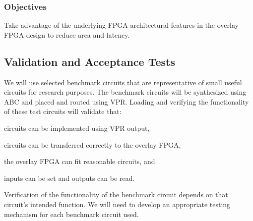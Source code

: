 \subsubsection{Objectives}

\begin{itemlist}
	\item Take advantage of the underlying FPGA architectural features in the overlay FPGA design to reduce area and latency.
\end{itemlist}


\subsection{Validation and Acceptance Tests}


We will use selected benchmark circuits  that are representative of small useful circuits for research purposes.
The benchmark circuits will be synthesized using ABC and placed and routed using VPR.
Loading and verifying the functionality of these test circuits will validate that:
\begin{itemlist}
	\item circuits can be implemented using VPR output,
	\item circuits can be transferred correctly to the overlay FPGA,
	\item the overlay FPGA can fit reasonable circuits, and
	\item inputs can be set and outputs can be read.
\end{itemlist}

Verification of the functionality of the benchmark circuit depends on that circuit's intended function.
We will need to develop an appropriate testing mechanism for each benchmark circuit used.


